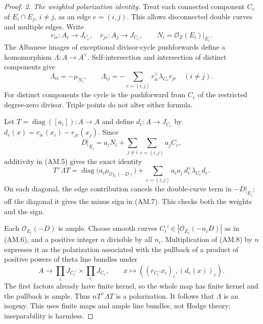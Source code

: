 \begin{proof}
\emph{2. The weighted polarization identity.}
Treat each connected component $C_e$ of $E_i\cap E_j$,
$i\ne j$, as an edge $e=(i,j)$. This allows disconnected double
curves and multiple edges. Write
\[
 r_{ie}:A_i\to J_{C_e},\quad r_{je}:A_j\to J_{C_e},
 \qquad N_i=\mathcal O_Z(E_i)|_{E_i}.
\]
The Albanese images of exceptional divisor-cycle pushforwards
define a homomorphism $\Lambda:A\to A^\vee$.
Self-intersection and intersection of distinct components give
\begin{equation}
 \Lambda_{ii}=-\mu_{N_i},\qquad
 \Lambda_{ij}=-\sum_{e=(i,j)}
                  r_{ie}^\vee\lambda_{C_e}r_{je}\quad(i\ne j).
                                                        \tag{AM.7}
\end{equation}
For distinct components the cycle is the pushforward from $C_e$
of the restricted degree-zero divisor. Triple points do not
alter either formula.

Let $T=\operatorname{diag}([a_i]):A\to A$ and define
$d_e:A\to J_{C_e}$ by
$d_e(x)=r_{ie}(x_i)-r_{je}(x_j)$. Since
\[
 D|_{E_i}=a_iN_i+\sum_{j\ne i}\sum_{e=(i,j)}a_jC_e,
\]
additivity in (AM.5) gives the exact identity
\begin{equation}
 T^\vee\Lambda T
   =\operatorname{diag}\bigl(a_i\mu_{\mathcal O_{E_i}(-D)}\bigr)
       +\sum_{e=(i,j)}a_i a_j\,d_e^\vee\lambda_{C_e}d_e.
                                                        \tag{AM.8}
\end{equation}
On each diagonal, the edge contribution cancels the double-curve
term in $-D|_{E_i}$; off the diagonal it gives the minus sign in
(AM.7). This checks both the weights and the sign.

Each $\mathcal O_{E_i}(-D)$ is ample. Choose smooth curves
$C_i'\in|\mathcal O_{E_i}(-n_iD)|$ as in (AM.6), and a positive
integer $n$ divisible by all $n_i$. Multiplication of (AM.8)
by $n$ expresses it as the polarization associated with the
pullback of a product of positive powers of theta line bundles
under
\[
 A\longrightarrow\prod_iJ_{C_i'}\times\prod_eJ_{C_e},
 \qquad x\longmapsto((r_{C_i'}x_i)_i,(d_e(x))_e).
\]
The first factors already have finite kernel, so the whole map
has finite kernel and the pullback is ample. Thus
$nT^\vee\Lambda T$ is a polarization. It follows that $\Lambda$
is an isogeny. This uses finite maps and ample line bundles,
not Hodge theory; inseparability is harmless.


\end{proof}
